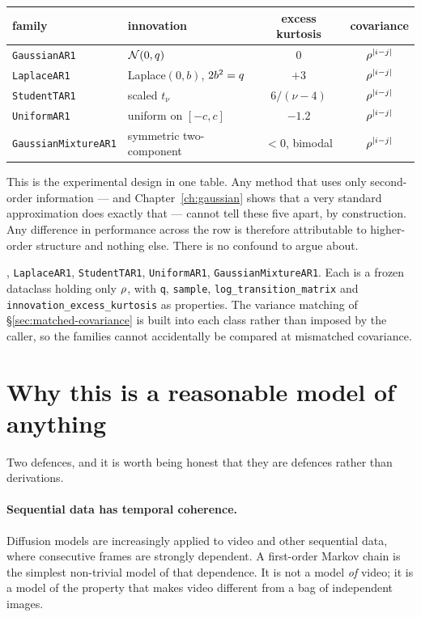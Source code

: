 \begin{center}
\small
\begin{tabular}{@{}llcc@{}}
\toprule
family & innovation & excess kurtosis & covariance \\
\midrule
\texttt{GaussianAR1} & $\mathcal{N}\!\left(0,q\right)$ & $0$ & $\rho^{|i-j|}$ \\
\texttt{LaplaceAR1} & Laplace$(0,b)$, $2b^2=q$ & $+3$ & $\rho^{|i-j|}$ \\
\texttt{StudentTAR1} & scaled $t_\nu$ & $6/(\nu-4)$ & $\rho^{|i-j|}$ \\
\texttt{UniformAR1} & uniform on $[-c,c]$ & $-1.2$ & $\rho^{|i-j|}$ \\
\texttt{GaussianMixtureAR1} & symmetric two-component & $<0$, bimodal & $\rho^{|i-j|}$ \\
\bottomrule
\end{tabular}
\end{center}

\begin{intuition}
This is the experimental design in one table. Any method that uses only second-order
information --- and Chapter~\ref{ch:gaussian} shows that a very standard approximation does
exactly that --- cannot tell these five apart, by construction. Any difference in performance
across the row is therefore attributable to higher-order structure and nothing else. There is
no confound to argue about.
\end{intuition}

\begin{codebox}
, \texttt{LaplaceAR1}, \texttt{StudentTAR1},
\texttt{UniformAR1}, \texttt{GaussianMixtureAR1}. Each is a frozen dataclass holding only
$\rho$, with \texttt{q}, \texttt{sample}, \texttt{log\_transition\_matrix} and
\texttt{innovation\_excess\_kurtosis} as properties. The variance matching of
\S\ref{sec:matched-covariance} is built into each class rather than imposed by the caller,
so the families cannot accidentally be compared at mismatched covariance.
\end{codebox}

\section{Why this is a reasonable model of anything}

Two defences, and it is worth being honest that they are defences rather than derivations.

\paragraph{Sequential data has temporal coherence.} Diffusion models are increasingly applied
to video and other sequential data, where consecutive frames are strongly dependent. A
first-order Markov chain is the simplest non-trivial model of that dependence. It is not a
model \emph{of} video; it is a model of the property that makes video different from a bag of
independent images.

